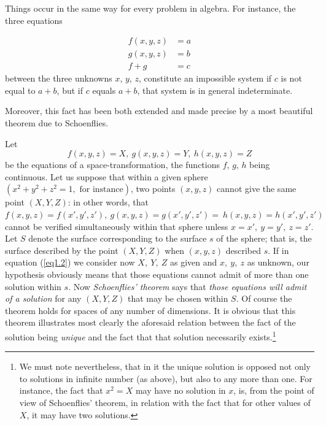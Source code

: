 \documentclass[12pt,oneside]{book}
\begin{document}
Things occur in the same way for every problem in algebra. For instance, the
three equations

\begin{align*}
    f(x,y,z)&=a \\
    g(x,y,z)&=b \\
    f+g&=c
\end{align*}
between the three unknowns $x$, $y$, $z$, constitute an impossible system if $c$
is not equal to $a+b$, but if $c$ equals $a+b$, that system is in general
indeterminate. \par

Moreover, this fact has been both extended and made precise by a most beautiful
theorem due to Schoenflies. \par

Let
\begin{equation}
    \label{eq1.2}
    f(x,y,z)=X, \ g(x,y,z)=Y, \ h(x,y,z)=Z
\end{equation}
be the equations of a space-transformation, the functions $f$, $g$, $h$ being
continuous. Let us suppose that within a given sphere $(x^2+y^2+z^2=1,\text{ for
instance})$, two points $(x,y,z)$ cannot give the same point $(X,Y,Z)$: in other
words, that $f(x,y,z)=f(x',y',z'),\ g(x,y,z)=g(x',y',z')=\ h(x,y,z)=h(x',y',z')$
cannot be verified simultaneously within that sphere unless $x=x',\ y=y',\
z=z'$. Let $S$ denote the surface corresponding to the surface $s$ of the
sphere; that is, the surface described by the point $(X,Y,Z)$ when $(x,y,z)$
described $s$. If in equation (\ref{eq1.2}) we consider now $X,\ Y,\ Z$ as given
and $x,\ y,\ z$ as unknown, our hypothesis obviously means that those equations
cannot admit of more than one solution within $s$. Now \textit{Schoenflies'
theorem} says that \textit{those equations will admit of a solution} for any
$(X,Y,Z)$ that may be chosen within $S$. Of course the theorem holds for spaces
of any number of dimensions. It is obvious that this theorem illustrates most
clearly the aforesaid relation between the fact of the solution being
\textit{unique} and the fact that that solution necessarily exists.\footnote{We
must note nevertheless, that in it the unique solution is opposed not only to
solutions in infinite number (as above), but also to any more than one. For
instance, the fact that $x^2=X$ may have no solution in $x$, is, from the point
of view of Schoenflies' theorem, in relation with the fact that for other values
of $X$, it may have two solutions.} \par
\end{document}
